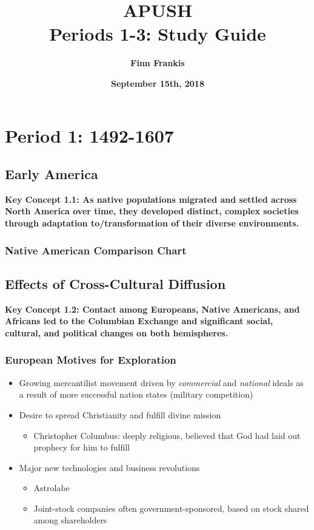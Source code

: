 \documentclass{article}
\title{%
      \LARGE \textbf{APUSH} \\ \Large \textbf{Periods 1-3: Study Guide}}
\author{\textbf{Finn Frankis}}
\date{\textbf{September 15th, 2018}}
\begin{document}
    \maketitle
    \setcounter{tocdepth}{2}
    \tableofcontents
    \section{Period 1: 1492-1607}
    \subsection{Early America}
    \textbf{Key Concept 1.1: As native populations migrated and settled across North America over time, they developed distinct, complex societies through adaptation to/transformation of their diverse environments.}
    \subsubsection{Native American Comparison Chart}
    \subsection{Effects of Cross-Cultural Diffusion}
        
    \textbf{Key Concept 1.2: Contact among Europeans, Native Americans, and Africans led to the Columbian Exchange and significant social, cultural, and political changes on both hemispheres.}
    \subsubsection{European Motives for Exploration}
    \begin{itemize}
        \item Growing mercantilist movement driven by \textit{commercial} and \textit{national} ideals as a result of more successful nation states (military competition)
        \item Desire to spread Christianity and fulfill divine mission
        \begin{itemize}
            \item Christopher Columbus: deeply religious, believed that God had laid out prophecy for him to fulfill
        \end{itemize}
        \item Major new technologies and business revolutions
        \begin{itemize}
            \item Astrolabe
            \item Joint-stock companies often government-sponsored, based on stock shared among shareholders
        \end{itemize}
    \end{itemize}
\end{document}
